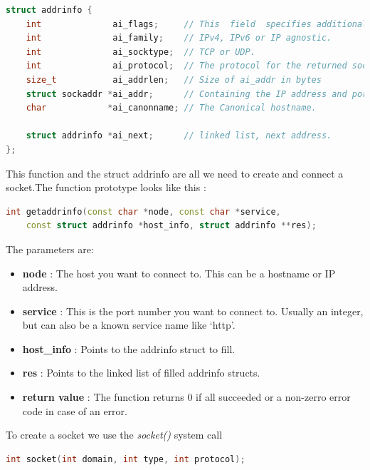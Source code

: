 \documentclass{article}
\begin{document}
				\begin{lstlisting}[language=C++, caption={The structure ``addrinfo''}]
struct addrinfo {
    int              ai_flags;     // This  field  specifies additional options.
    int              ai_family;    // IPv4, IPv6 or IP agnostic.
    int              ai_socktype;  // TCP or UDP.
    int              ai_protocol;  // The protocol for the returned socket addresses.
    size_t           ai_addrlen;   // Size of ai_addr in bytes
    struct sockaddr *ai_addr;      // Containing the IP address and port.
    char            *ai_canonname; // The Canonical hostname.

    struct addrinfo *ai_next;      // linked list, next address.
};
				\end{lstlisting}

				This function and the struct addrinfo are all we need to create and connect a socket.The function prototype looks like this : 

				\begin{lstlisting}[language=C++, caption={getaddrinfo() function}]
int getaddrinfo(const char *node, const char *service,
	const struct addrinfo *host_info, struct addrinfo **res); 
				\end{lstlisting}

				The parameters are:

				\begin{itemize}
					\item \textbf{node} : The host you want to connect to. This can be a hostname or IP address. 
					\item \textbf{service} : This is the port number you want to connect to. Usually an integer, but can also be a known service name like `http'. 					
					\item \textbf{host\_info} : Points to the addrinfo struct to fill. 					
					\item \textbf{res} : Points to the linked list of filled addrinfo structs. 
					\item \textbf{return value} : The function returns 0 if all succeeded or a non-zerro error code in case of an error.  
				\end{itemize}
				
				To create a socket we use the \textit{socket()} system call 

				\begin{lstlisting}[language=C++, caption={socket() function}]
int socket(int domain, int type, int protocol); 
				\end{lstlisting} 	
\end{document}
